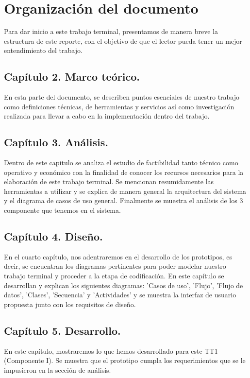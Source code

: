 \documentclass[12pt, a4paper, titlepage]{report}
\begin{document}
        \section{Organización del documento}
            Para dar inicio a este trabajo terminal, presentamos de manera breve la estructura de este reporte, con el objetivo de que el lector pueda tener un mejor entendimiento del trabajo.
            

            \subsection{Capítulo 2. Marco teórico.}
                En esta parte del documento, se describen puntos esenciales de nuestro trabajo como definiciones técnicas, de herramientas y servicios así como investigación realizada para llevar a cabo en la implementación dentro del trabajo. 
             
            \subsection{Capítulo 3. Análisis.}
                Dentro de este capitulo se analiza el estudio de factibilidad tanto t\'ecnico como operativo y económico con la finalidad de conocer los recursos necesarios para la elaboración de este trabajo terminal. Se mencionan resumidamente las herramientas a utilizar y se explica de manera general la arquitectura del sistema  y el diagrama de casos de uso general. Finalmente se muestra el análisis de los 3 componente que tenemos en el sistema.
             
            \subsection{Capítulo 4. Diseño.}
                En el cuarto capítulo, nos adentraremos en el desarrollo de los prototipos, es decir, se encuentran los diagramas pertinentes para poder modelar nuestro trabajo terminal y proceder a la etapa de codificación. En este capítulo se desarrollan y explican los siguientes diagramas: 'Casos de uso', 'Flujo', 'Flujo de datos', 'Clases', 'Secuencia' y 'Actividades' y se muestra la interfaz de usuario propuesta junto con los requisitos de diseño.
                
            \subsection{Capítulo 5. Desarrollo.}
                En este capítulo, mostraremos lo que hemos desarrollado para este TT1 (Componente I). Se muestra que el prototipo cumpla los requerimientos que se le impusieron en la sección de análisis.
            
\end{document}
